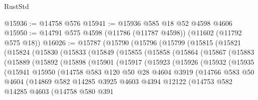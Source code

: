 \begin{lexlean}{RustStd}
\begin{coremodule}
@15936 := @14758 @576
@15941 := @15936 @585 @18 @52 @4598 @4606
@15950 := @14791 @575 @4598 (@11786 (@11787 @4598)) (@11602 (@11792 @575 @18))
@16026 := @15787
    (@15790
      (@15796
        (@15799
          (@15815
            (@15821
              (@15824
                (@15830
                  (@15833
                    (@15849
                      (@15855
                        (@15858
                          (@15864
                            (@15867
                              (@15883
                                (@15889
                                  (@15892
                                    (@15898
                                      (@15901
                                        (@15917
                                          (@15923
                                            (@15926
                                              (@15932
                                                (@15935
                                                  (@15941
                                                    @15950
                                                    (@14758
                                                      @583
                                                      @120
                                                      @50
                                                      @28
                                                      @4604
                                                      @3919
                                                      (@14766
                                                        @583
                                                        @50
                                                        @4604
                                                        (@14869
                                                          @582
                                                          @14285
                                                          @3925
                                                          @4603
                                                          @4394
                                                          @12122
                                                          (@14753
                                                            @582
                                                            @14285
                                                            @4603
                                                            (@14758
                                                              @580
                                                              @391

\end{coremodule}
\end{lexlean}
